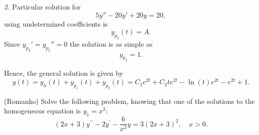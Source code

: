 \documentclass[11pt]{article}
\begin{document}
\begin{solution}
\par \textsl{2.} Particular solution for
\[5y'' -20 y' +20 y = 20,\] using undetermined coefficients is
\begin{equation*}
     y_{p_{2}}(t)=A.
\end{equation*}
Since $y_{p_{2}}'=y_{p_{2}}''=0$ the solution is as simple as \[y_{p_{2}}=1.\]

Hence, the general solution is given by
\begin{equation*}
\boxed{y(t) = y_{h}(t) + y_{p_{1}}(t) + y_{p_{2}}(t) =C_{1}e^{2t}+C_{2}te^{2t} -\ln (t)e^{2t} - e^{2t} + 1 }.
\end{equation*}
\end{solution}



\begin{problem}
(Romanko) Solve the following problem, knowing that one of the solutions to
the homogeneous equation is $y_1 = x^2$:
\begin{equation*}     
  \left( 2x + 3 \right) y^{\prime \prime} - 2 y^{\prime} - \frac {6} {x^2} y
  = 3 \left( 2x + 3 \right)^2, \quad x>0.
\end{equation*}
\end{problem}
\end{document}
